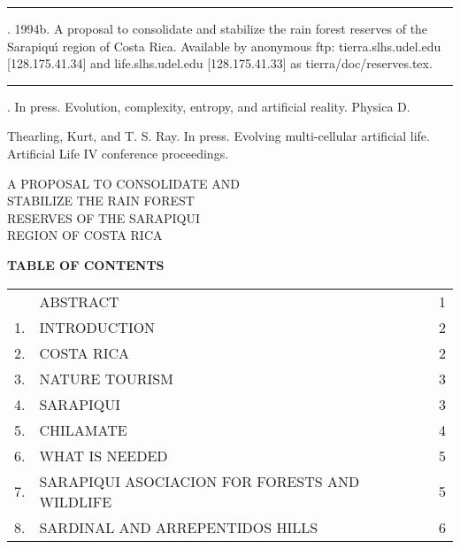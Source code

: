 \rule[0pt]{3em}{.4pt}.  1994b.  A proposal to consolidate and stabilize
the rain forest reserves of the Sarapiqu\'{\i} region of Costa Rica.
Available by anonymous ftp: tierra.slhs.udel.edu [128.175.41.34] and
life.slhs.udel.edu [128.175.41.33] as tierra/doc/reserves.tex.

\rule[0pt]{3em}{.4pt}.  In press.  Evolution, complexity, entropy,
and artificial reality.  Physica D.

Thearling, Kurt, and T. S. Ray.  In press.  Evolving multi-cellular
artificial life.  Artificial Life IV conference proceedings.

\eXP

\newpage
\setcounter{page}{1}

\begin{center}
{\Large {\bf

A PROPOSAL TO CONSOLIDATE AND\\
STABILIZE THE RAIN FOREST\\
RESERVES OF THE SARAPIQUI\\
REGION OF COSTA RICA\\}}

\vspace{1cm}
{\large {\bf              TABLE OF CONTENTS\\}}
\vspace{.5cm}

\begin{tabular}{lll}
    & ABSTRACT                                      & 1\\

1.  & INTRODUCTION                                  & 2\\

2.  & COSTA RICA                                    & 2\\

3.  & NATURE TOURISM                                & 3\\

4.  & SARAPIQUI                                     & 3\\

5.  & CHILAMATE                                     & 4\\

6.  & WHAT IS NEEDED                                & 5\\

7.  & SARAPIQUI ASOCIACION FOR FORESTS AND WILDLIFE & 5\\

8.  & SARDINAL AND ARREPENTIDOS HILLS               & 6\\


\end{tabular}
\end{center}

